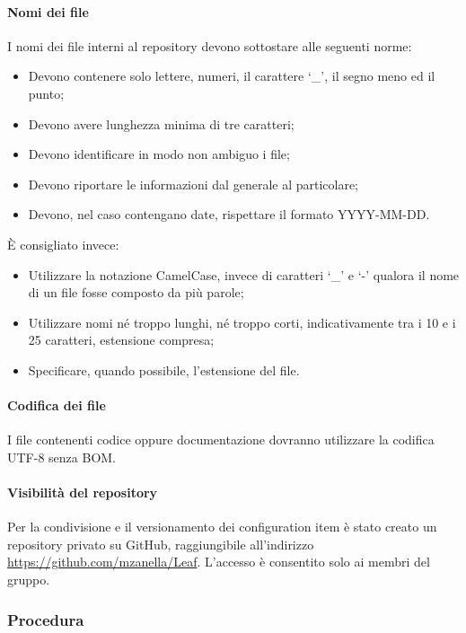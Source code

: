 \documentclass[../NormeProgetto.tex]{subfiles}
\begin{document}
	\paragraph{Nomi dei file}
	I nomi dei file interni al repository devono sottostare alle seguenti norme:
	\begin{itemize}
		\item Devono contenere solo lettere, numeri, il carattere `\_', il segno meno ed il punto;
		\item Devono avere lunghezza minima di tre caratteri;
		\item Devono identificare in modo non ambiguo i file;
		\item Devono riportare le informazioni dal generale al particolare;
		\item Devono, nel caso contengano date, rispettare il formato YYYY-MM-DD.
	\end{itemize}
	È consigliato invece:
	\begin{itemize}
		\item Utilizzare la notazione CamelCase, invece di caratteri `\_' e `-' qualora il nome di un file fosse composto da più parole;
		\item Utilizzare nomi né troppo lunghi, né troppo corti, indicativamente tra i 10 e i 25 caratteri, estensione compresa;
		\item Specificare, quando possibile, l'estensione del file.
	\end{itemize}
	\paragraph{Codifica dei file}
	I file contenenti codice oppure documentazione dovranno utilizzare la codifica UTF-8 senza BOM.
	\paragraph{Visibilità del repository}
	Per la condivisione e il versionamento dei configuration item è stato creato un repository privato su GitHub, raggiungibile all'indirizzo \url{https://github.com/mzanella/Leaf}. L'accesso è consentito solo ai membri del gruppo.	
	\subsubsection{Procedura}
\end{document}
